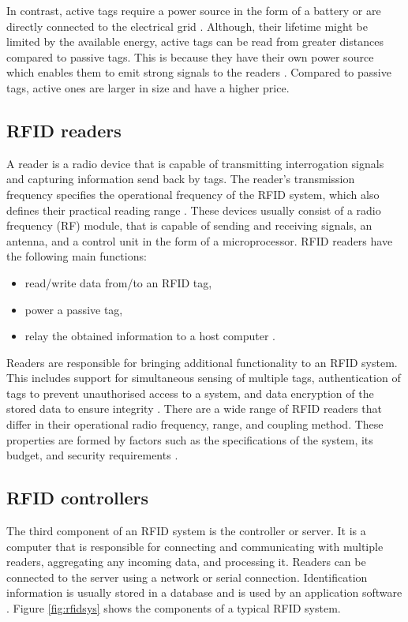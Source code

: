 In contrast, active tags require a power source in the form of a battery or are directly connected to the electrical grid \cite{Want2006}. Although, their lifetime might be limited by the available energy, active tags can be read from greater distances compared to passive tags. This is because they have their own power source which enables them to emit strong signals to the readers \cite{Weinstein2005}. Compared to passive tags, active ones are larger in size and have a higher price.

\subsection{RFID readers}

A reader is a radio device that is capable of transmitting interrogation signals and capturing information send back by tags. The reader's transmission frequency specifies the operational frequency of the RFID system, which also defines their practical reading range \cite{Finkenzeller2010}. These devices usually consist of a radio frequency (RF) module, that is capable of sending and receiving  signals, an antenna, and a control unit in the form of a microprocessor. RFID readers have the following main functions:

\begin{itemize}
	\item read/write data from/to an RFID tag,
	\item power a passive tag,
	\item relay the obtained information to a host computer \cite[p. 9]{Hunt2007}.
\end{itemize}

Readers are responsible for bringing additional functionality to an RFID system. This includes support for simultaneous sensing of multiple tags, authentication of tags to prevent unauthorised access to a system, and data encryption of the stored data to ensure integrity \cite[p. 10]{Hunt2007}. There are a wide range of RFID readers that differ in their operational radio frequency, range, and coupling method. These properties are formed by factors such as the specifications of the system, its budget, and security requirements \cite[p. 25]{Finkenzeller2010}.

\subsection{RFID controllers}

The third component of an RFID system is the controller or server. It is a computer that is responsible for connecting and communicating with multiple readers, aggregating any incoming data, and processing it. Readers can be connected to the server using a network or serial connection. Identification information is usually stored in a database and is used by an application software \cite[p. 11]{Hunt2007}. Figure \ref{fig:rfidsys} shows the components of a typical RFID system.

